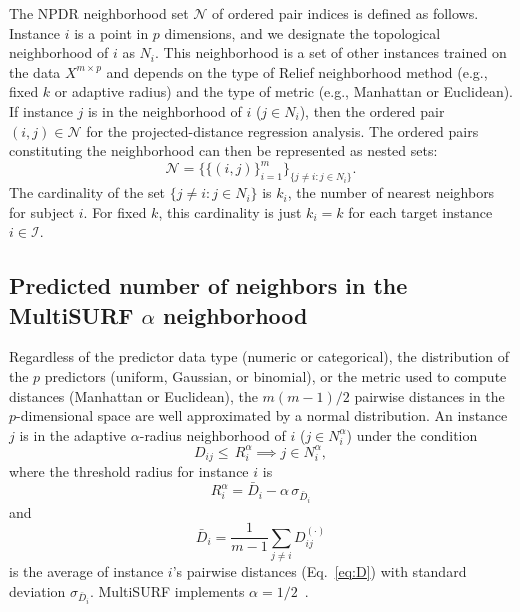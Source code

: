 \documentclass[10pt,letterpaper]{article}
\begin{document}
The NPDR neighborhood set $\mathcal{N}$ of ordered pair indices is defined as follows. Instance $i$ is a point in $p$ dimensions, and we designate the topological neighborhood of $i$ as $N_{i}$. This neighborhood is a set of other instances trained on the data $X^{m \times p}$ and depends on the type of Relief neighborhood method (e.g., fixed $k$ or adaptive radius) and the type of metric (e.g., Manhattan or Euclidean). If instance $j$ is in the neighborhood of $i$ ($j \in N_{i}$), then the ordered pair $(i,j) \in \mathcal{N}$ for the projected-distance regression analysis. The ordered pairs constituting the neighborhood can then be represented as nested sets:
\begin{equation}\label{eq:N}
\mathcal{N}=\{\{(i, j)\}_{i=1}^{m}\}_{\{j \ne i : j \in N_{i}\}}.
\end{equation}
The cardinality of the set $\{j \ne i : j \in N_{i}\}$ is $k_i$, the number of nearest neighbors for subject $i$. For fixed $k$, this cardinality is just $k_i = k$ for each target instance $i \in \mathcal{I}$.

\subsection{Predicted number of neighbors in the MultiSURF \texorpdfstring{$\alpha$}{} neighborhood}

Regardless of the predictor data type (numeric or categorical), the distribution of the $p$ predictors (uniform, Gaussian, or binomial), or the metric used to compute distances (Manhattan or Euclidean), the $m(m-1)/2$ pairwise distances in the $p$-dimensional space are well approximated by a normal distribution. An instance $j$ is in the adaptive $\alpha$-radius neighborhood of $i$ ($j \in N^{\alpha}_{i}$) under the condition
%
%
\begin{equation}
D_{ij} \le \, R_i^{\alpha} \implies j \in N^{\alpha}_{i},
\end{equation}
where the threshold radius for instance $i$ is
\begin{equation}\label{eq:alpha-radius}
R_i^{\alpha} =  \bar{D}_i - \alpha \, \sigma_{\bar{D}_i}
\end{equation}
and
\begin{equation}
\bar{D}_i = \frac{1}{m-1} \sum_{j \ne i} D^{(\cdot)}_{ij}
\end{equation}
is the average of instance $i$'s pairwise distances (Eq.~\ref{eq:D}) with standard deviation $\sigma_{\bar{D}_i}$. MultiSURF implements $\alpha=1/2$~\cite{urbanowicz17}.
\end{document}
